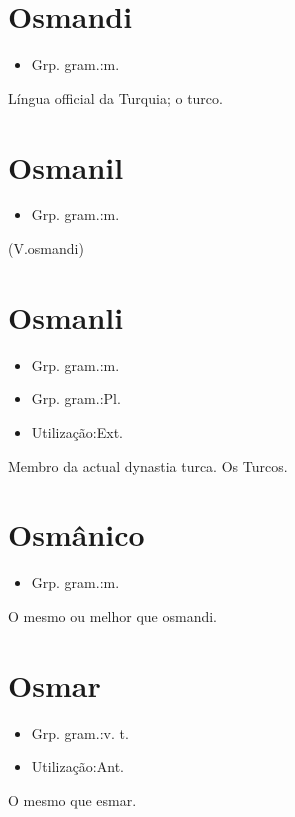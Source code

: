 \section{Osmandi}
\begin{itemize}
\item {Grp. gram.:m.}
\end{itemize}
Língua official da Turquia; o turco.
\section{Osmanil}
\begin{itemize}
\item {Grp. gram.:m.}
\end{itemize}
(V.osmandi)
\section{Osmanli}
\begin{itemize}
\item {Grp. gram.:m.}
\end{itemize}
\begin{itemize}
\item {Grp. gram.:Pl.}
\end{itemize}
\begin{itemize}
\item {Utilização:Ext.}
\end{itemize}
Membro da actual dynastia turca.
Os Turcos.
\section{Osmânico}
\begin{itemize}
\item {Grp. gram.:m.}
\end{itemize}
O mesmo ou melhor que \textunderscore osmandi\textunderscore .
\section{Osmar}
\begin{itemize}
\item {Grp. gram.:v. t.}
\end{itemize}
\begin{itemize}
\item {Utilização:Ant.}
\end{itemize}
O mesmo que \textunderscore esmar\textunderscore .
